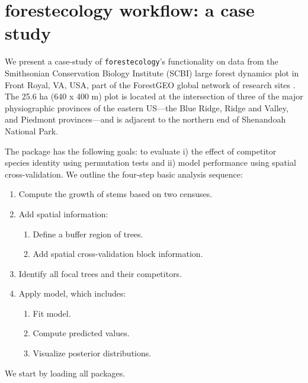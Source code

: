 \documentclass[12pt]{article}
\providecommand{\tightlist}{%
  \setlength{\itemsep}{0pt}\setlength{\parskip}{0pt}}
\begin{document}
\hypertarget{casestudy}{%
\section{forestecology workflow: a case study}\label{casestudy}}

We present a case-study of \texttt{forestecology}'s functionality on
data from the Smithsonian Conservation Biology Institute (SCBI) large
forest dynamics plot in Front Royal, VA, USA, part of the ForestGEO
global network of research sites
\citep[\citet{andersonteixeira_ctfs-forestgeo_2015},
\citet{davies_forestgeo_2021}]{bourg_initial_2013}. The 25.6 ha (640 x
400 m) plot is located at the intersection of three of the major
physiographic provinces of the eastern US---the Blue Ridge, Ridge and
Valley, and Piedmont provinces---and is adjacent to the northern end of
Shenandoah National Park.

The package has the following goals: to evaluate i) the effect of
competitor species identity using permutation tests and ii) model
performance using spatial cross-validation. We outline the four-step
basic analysis sequence:

\begin{enumerate}
\def\labelenumi{\arabic{enumi}.}
\tightlist
\item
  Compute the growth of stems based on two censuses.
\item
  Add spatial information:

  \begin{enumerate}
  \def\labelenumii{\arabic{enumii}.}
  \tightlist
  \item
    Define a buffer region of trees.
  \item
    Add spatial cross-validation block information.
  \end{enumerate}
\item
  Identify all focal trees and their competitors.
\item
  Apply model, which includes:

  \begin{enumerate}
  \def\labelenumii{\arabic{enumii}.}
  \tightlist
  \item
    Fit model.
  \item
    Compute predicted values.
  \item
    Visualize posterior distributions.
  \end{enumerate}
\end{enumerate}

We start by loading all packages.
\end{document}
